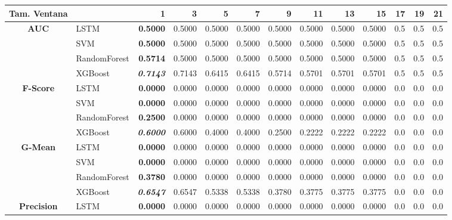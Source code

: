 \begin{table}[H]
	\centering
	\begin{adjustbox}{max width=12cm}
		\begin{tabular}{|c|l|r|r|r|r|r|r|r|r|r|r|r|}
			\hline
			\textbf{Tam. Ventana}&         &      1  &      3  &      5  &      7  &      9  &      11 &      13 &      15 &   17 &   19 &   21 \\
			\hline
			\textbf{AUC} &  LSTM & \textbf{  0.5000 } &  0.5000 &  0.5000 &  0.5000 &  0.5000 &  0.5000 &  0.5000 &  0.5000 &  0.5 &  0.5 &  0.5 \\
			&  SVM & \textbf{  0.5000 } &  0.5000 &  0.5000 &  0.5000 &  0.5000 &  0.5000 &  0.5000 &  0.5000 &  0.5 &  0.5 &  0.5 \\
			&  RandomForest & \textbf{  0.5714 } &  0.5000 &  0.5000 &  0.5000 &  0.5000 &  0.5000 &  0.5000 &  0.5000 &  0.5 &  0.5 &  0.5 \\
			&  XGBoost & \textit{ \textbf{  0.7143 } } &  0.7143 &  0.6415 &  0.6415 &  0.5714 &  0.5701 &  0.5701 &  0.5701 &  0.5 &  0.5 &  0.5 \\
			\hline
			\textbf{F-Score} &  LSTM & \textbf{  0.0000 } &  0.0000 &  0.0000 &  0.0000 &  0.0000 &  0.0000 &  0.0000 &  0.0000 &  0.0 &  0.0 &  0.0 \\
			&  SVM & \textbf{  0.0000 } &  0.0000 &  0.0000 &  0.0000 &  0.0000 &  0.0000 &  0.0000 &  0.0000 &  0.0 &  0.0 &  0.0 \\
			&  RandomForest & \textbf{  0.2500 } &  0.0000 &  0.0000 &  0.0000 &  0.0000 &  0.0000 &  0.0000 &  0.0000 &  0.0 &  0.0 &  0.0 \\
			&  XGBoost & \textit{ \textbf{  0.6000 } } &  0.6000 &  0.4000 &  0.4000 &  0.2500 &  0.2222 &  0.2222 &  0.2222 &  0.0 &  0.0 &  0.0 \\
			\hline
			\textbf{G-Mean} &  LSTM & \textbf{  0.0000 } &  0.0000 &  0.0000 &  0.0000 &  0.0000 &  0.0000 &  0.0000 &  0.0000 &  0.0 &  0.0 &  0.0 \\
			&  SVM & \textbf{  0.0000 } &  0.0000 &  0.0000 &  0.0000 &  0.0000 &  0.0000 &  0.0000 &  0.0000 &  0.0 &  0.0 &  0.0 \\
			&  RandomForest & \textbf{  0.3780 } &  0.0000 &  0.0000 &  0.0000 &  0.0000 &  0.0000 &  0.0000 &  0.0000 &  0.0 &  0.0 &  0.0 \\
			&  XGBoost & \textit{ \textbf{  0.6547 } } &  0.6547 &  0.5338 &  0.5338 &  0.3780 &  0.3775 &  0.3775 &  0.3775 &  0.0 &  0.0 &  0.0 \\
			\hline
			\textbf{Precision} &  LSTM & \textbf{  0.0000 } &  0.0000 &  0.0000 &  0.0000 &  0.0000 &  0.0000 &  0.0000 &  0.0000 &  0.0 &  0.0 &  0.0 \\

\end{tabular}
\end{adjustbox}
\end{table}
